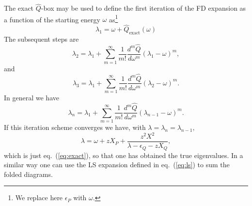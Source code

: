 The exact $\hat{Q}$-box
may be used to define the first iteration of
the FD expansion as a function of the starting energy 
$\omega$ as\footnote{We replace here $\epsilon_P$ with $\omega$.}
\begin{equation}
      \lambda_1= \omega+\hat{Q}_{\mathrm{exact}}(\omega)
\end{equation}
The subsequent steps are
\begin{equation}
     \lambda_2= \lambda_1+
     {\displaystyle \sum_{m=1}^{\infty}
     \frac{1}{m!}\frac{d^m \hat{Q}}{d\omega^m}(\lambda_1
     -\omega )^m },
\end{equation}
and
\begin{equation}
    \lambda_3= \lambda_1+
     {\displaystyle \sum_{m=1}^{\infty}
     \frac{1}{m!}\frac{d^m \hat{Q}}{d\omega^m}(\lambda_2-
     \omega )^m }.
\end{equation}
In general we have
\begin{equation}
     \lambda_n= \lambda_1+
     {\displaystyle \sum_{m=1}^{\infty}
     \frac{1}{m!}\frac{d^m \hat{Q}}{d\omega^m}(\lambda_{n-1}-
     \omega )^m }.
\end{equation}
If this iteration scheme converges we have, with
$\lambda=\lambda_{n}=\lambda_{n-1}$,
\begin{equation}
   \lambda=\omega +zX_P+\frac{z^2X^2}{\lambda -\epsilon_Q-zX_Q},
   \label{eq:exact2}
\end{equation}
which is just eq.\ (\ref{eq:exact}), so that one has
obtained the true eigenvalues.
In a similar way one can use the LS expansion defined
in eq.\ (\ref{eq:ls}) to sum the folded diagrams.
